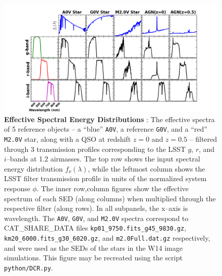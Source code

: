 \documentclass[DM,toc]{lsstdoc}
\begin{document}
\begin{figure}[!t]
  \centering
  \includegraphics[width=1.1\textwidth]{DCR1.png}
  \caption{{\bf Effective Spectral Energy Distributions} : The
    effective spectra of 5 reference objects -- a ``blue'' {\tt A0V},
    a reference {\tt G0V}, and a ``red'' {\tt M2.0V} star, along with
    a QSO at redshift $z=0$ and $z=0.5$ -- filtered through 3
    transmission profiles corresponding to the LSST $g$, $r$, and
    $i$--bands at 1.2 airmasses.  The top row shows the input spectral
    energy distribution $f_\nu(\lambda)$, while the leftmost column
    shows the LSST filter transmission profile in units of the
    normalized system response $\phi$.  The inner row,column figures
    show the effective spectrum of each SED (along columns) when
    multiplied through the respective filter (along rows).  In all
    subpanels, the x--axis is wavelength.  The {\tt A0V}, {\tt G0V},
    and {\tt M2.0V} spectra correspond to {CAT\_SHARE\_DATA} files
    {\tt kp01\_9750.fits\_g45\_9830.gz}, {\tt
      km20\_6000.fits\_g30\_6020.gz}, and {\tt m2.0Full.dat.gz}
    respectively, and were used as the SEDs of the stars in the W14
    image simulations.  This figure may be recreated using the script
    {\tt python/DCR.py}.}
  \label{fig:spectra}
\end{figure}
\end{document}
